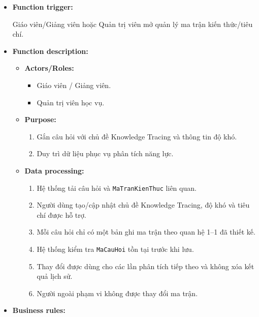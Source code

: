 \documentclass[12pt,a4paper,oneside]{report}
\begin{document}
\begin{itemize}

    \item \textbf{Function trigger:}

    Giáo viên/Giảng viên hoặc Quản trị viên mở quản lý ma trận kiến thức/tiêu chí.

    \item \textbf{Function description:}

    \begin{itemize}

        \item \textbf{Actors/Roles:}
        \begin{itemize}
            \item Giáo viên / Giảng viên.
            \item Quản trị viên học vụ.
        \end{itemize}

        \item \textbf{Purpose:}
        \begin{enumerate}
            \item Gắn câu hỏi với chủ đề Knowledge Tracing và thông tin độ khó.
            \item Duy trì dữ liệu phục vụ phân tích năng lực.
        \end{enumerate}

        \item \textbf{Data processing:}
        \begin{enumerate}
            \item Hệ thống tải câu hỏi và \texttt{MaTranKienThuc} liên quan.
            \item Người dùng tạo/cập nhật chủ đề Knowledge Tracing, độ khó và tiêu chí được hỗ trợ.
            \item Mỗi câu hỏi chỉ có một bản ghi ma trận theo quan hệ 1--1 đã thiết kế.
            \item Hệ thống kiểm tra \texttt{MaCauHoi} tồn tại trước khi lưu.
            \item Thay đổi được dùng cho các lần phân tích tiếp theo và không xóa kết quả lịch sử.
            \item Người ngoài phạm vi không được thay đổi ma trận.
        \end{enumerate}

    \end{itemize}

    \item \textbf{Business rules:}


\end{itemize}
\end{document}
